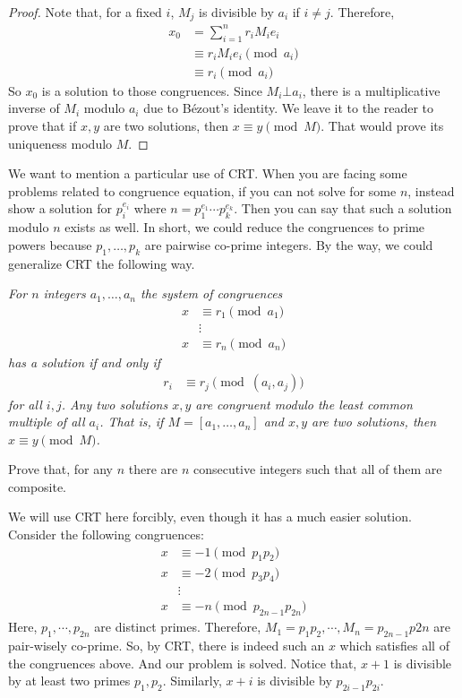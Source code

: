\documentclass{subfile}
\begin{document}
	\begin{proof}
		Note that, for a fixed $i$, $M_j$ is divisible by $a_i$ if $i\neq j$. Therefore,
		\begin{align*}
		x_0 & = \sum_{i=1}^{n} r_i M_ie_i\\
		&\equiv r_iM_ie_i\pmod{a_i}\\
		&\equiv r_i\pmod{a_i}
		\end{align*}
		So $x_0$ is a solution to those congruences. Since $M_i\bot a_i$, there is a multiplicative inverse of $M_i$ modulo $a_i$ due to B\'{e}zout's identity. We leave it to the reader to prove that if $x,y$ are two solutions, then $x\equiv y\pmod M$. That would prove its uniqueness modulo $M$.
		
	\end{proof}
	We want to mention a particular use of CRT. When you are facing some problems related to congruence equation, if you can not solve for some $n$, instead show a solution for $p_i^{e_i}$ where $n=p_1^{e_1}\cdots p_k^{e_k}$. Then you can say that such a solution modulo $n$ exists as well. In short, we could reduce the congruences to prime powers because $p_1,\ldots,p_k$ are pairwise co-prime integers. By the way, we could generalize CRT the following way.
	\begin{theorem}\slshape
		For $n$ integers $a_1,\ldots,a_n$ the system of congruences
		\begin{align*}
		x & \equiv r_1\pmod{a_1}\\
		& \vdots\\
		x & \equiv r_n\pmod{a_n}
		\end{align*}
		has a solution if and only if
		\begin{align*}
		r_i & \equiv r_j\pmod{(a_i,a_j)}
		\end{align*}
		for all $i,j$. Any two solutions $x,y$ are congruent modulo the least common multiple of all $a_i$. That is, if $M=[a_1,\ldots,a_n]$ and $x,y$ are two solutions, then $x\equiv y\pmod M$.
	\end{theorem}
	
	\begin{problem}
		Prove that, for any $n$ there are $n$ consecutive integers such that all of them are composite.
	\end{problem}
	
	\begin{solution}
		We will use CRT here forcibly, even though it has a much easier solution. Consider the following congruences:
			\begin{align*}
				x & \equiv-1\pmod{p_1p_2}\\
				x & \equiv-2\pmod{p_3p_4}\\
				  & \vdots\\
				x & \equiv-n\pmod{p_{2n-1}p_{2n}}
			\end{align*}
		Here, $p_1,\cdots,p_{2n}$ are distinct primes. Therefore, $M_1=p_1p_2,\cdots,M_n=p_{2n-1}p{2n}$ are pair-wisely co-prime. So, by CRT, there is indeed such an $x$ which satisfies all of the congruences above. And our problem is solved. Notice that, $x+1$ is divisible by at least two primes $p_1,p_2$. Similarly, $x+i$ is divisible by $p_{2i-1}p_{2i}$.
	\end{solution}
	
\end{document}
